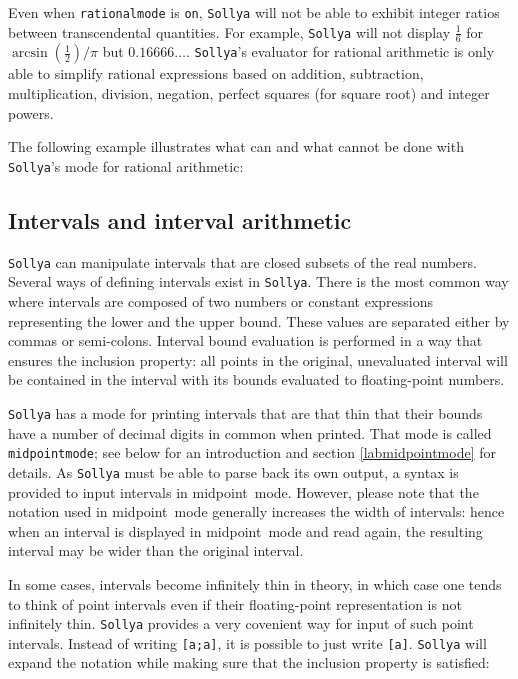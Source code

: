 \documentclass[a4paper]{article}
\newcommand{\com}[1]{\texttt{#1}}
\newcommand{\sollya}{\texttt{Sollya}\xspace}
\begin{document}
Even when \com{rationalmode} is \com{on}, \sollya will not be able to
exhibit integer ratios between transcendental quantities. For example,
\sollya will not display $\frac{1}{6}$ for $\arcsin\left(
\frac{1}{2} \right) / \pi$ but $0.16666\dots$. \sollya's evaluator
for rational arithmetic is only able to simplify rational expressions
based on addition, subtraction, multiplication, division, negation,
perfect squares (for square root) and integer powers.

The following example illustrates what can and what cannot be done
with \sollya's mode for rational arithmetic: 



\subsection{Intervals and interval arithmetic}

\sollya can manipulate intervals that are closed subsets of the real
numbers. Several ways of defining intervals exist in \sollya. There is the
most common way where intervals are composed of two numbers or
constant expressions representing the lower and the upper bound. These
values are separated either by commas or semi-colons. Interval bound 
evaluation is performed in a way that ensures the inclusion property:
all points in the original, unevaluated interval will be contained in
the interval with its bounds evaluated to floating-point numbers. 



\sollya has a mode for printing intervals that are that thin that
their bounds have a number of decimal digits in common when
printed. That mode is called \com{midpointmode}; see below for an
introduction and section \ref{labmidpointmode} for details. As \sollya
must be able to parse back its own output, a syntax is provided to
input intervals in midpoint~mode. However, please note that the
notation used in midpoint~mode generally increases the width of
intervals: hence when an interval is displayed in midpoint~mode and
read again, the resulting interval may be wider than the original
interval.



In some cases, intervals become infinitely thin in theory, in which
case one tends to think of point intervals even if their
floating-point representation is not infinitely thin. \sollya provides
a very covenient way for input of such point intervals. Instead of
writing \texttt{[a;a]}, it is possible to just write
\texttt{[a]}. \sollya will expand the notation while making sure that
the inclusion property is satisfied:
\end{document}
